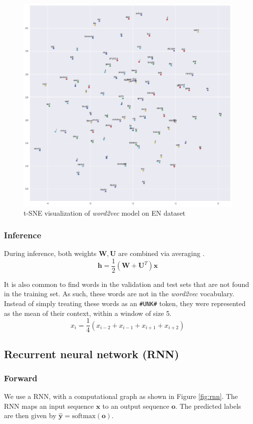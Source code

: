 \documentclass{article}
\numberwithin{equation}{section}
\begin{document}
\begin{figure}[h]
	\centering
	\includegraphics[width=0.9\linewidth]{assets/word2vec.png}
	\caption{t-SNE visualization of \emph{word2vec} model on EN dataset}
	\label{fig:word2vec}
\end{figure}

\subsubsection{Inference}
During inference, both weights $\bm{W}, \bm{U}$ are combined via averaging \cite{pennington2014glove}.
	$$ \bm{h} = \frac{1}{2}(\bm{W} + \bm{U}^T) \bm{x} $$

It is also common to find words in the validation and test sets that are not found in the training set. As such, these words are not in the \emph{word2vec} vocabulary. \\

Instead of simply treating these words as an \lstinline{#UNK#} token, they were represented as the mean of their context, within a window of size 5.
	$$ x_i = \frac{1}{4}(x_{i-2} + x_{i-1} + x_{i+1} + x_{i+2}) $$

\subsection{Recurrent neural network (RNN)}
\subsubsection{Forward}
We use a RNN, with a computational graph as shown in Figure \ref{fig:rnn}. The RNN maps an input sequence $\bm{x}$ to an output sequence $\bm{o}$. The predicted labels are then given by $\hat{\bm{y}} = \text{softmax}(\bm{o})$.\\
\end{document}
